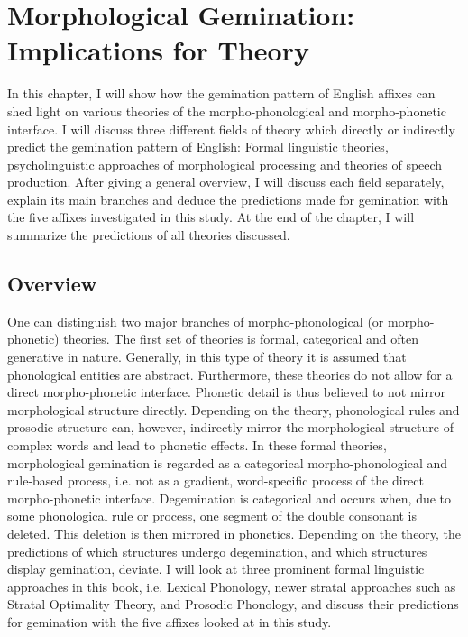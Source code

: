 \chapter {Morphological Gemination: Implications for Theory} \label{Theory}

In this chapter, I will show how the gemination pattern of English affixes can shed light on various theories of the morpho-phonological and morpho-phonetic interface. I will discuss three different fields of theory which directly or indirectly predict the gemination pattern of English: Formal linguistic theories, psycholinguistic approaches of morphological processing and theories of speech production. After giving a general overview, I will discuss each field  separately, explain its main branches and deduce the predictions made for gemination with the five affixes investigated in this study.  At the end of the chapter, I will summarize the predictions of all theories discussed.\\


\section{Overview}
One can distinguish two major branches of morpho-phonological (or morpho-phonetic) theories. The first set of theories is formal, categorical and often generative in nature. Generally, in this type of theory it is assumed that phonological entities are abstract. Furthermore, these theories do not allow for a direct morpho-phonetic interface. Phonetic detail is thus believed to not mirror morphological structure directly. Depending on the theory, phonological rules and prosodic structure can, however, indirectly mirror the morphological structure of complex words and lead to phonetic effects. 
In these formal theories, morphological gemination is regarded as a categorical morpho-phonological and rule-based process, i.e. not as a gradient, word-specific process of the direct morpho-phonetic interface. Degemination is categorical and occurs when, due to some phonological rule or process, one segment of the double consonant is deleted. This deletion is then mirrored in phonetics. Depending on the theory, the predictions of which structures undergo degemination, and which structures display gemination, deviate. I will look at three prominent formal linguistic approaches in this book, i.e. Lexical Phonology, newer stratal approaches such as Stratal Optimality Theory, and Prosodic Phonology,  and discuss their predictions for gemination with the five affixes looked at in this study. 

